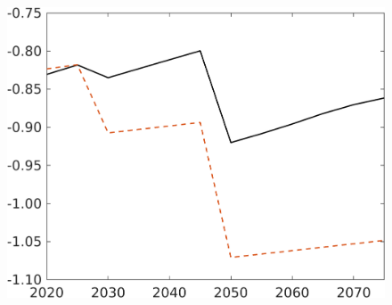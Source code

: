 \begin{figure}[h!!]
\begin{minipage}[]{0.32\textwidth}
\end{minipage}
\begin{minipage}[]{0.32\textwidth}
	\includegraphics[width=1\textwidth]{../../codding_model/own_basedOnFried/optimalPol_190722_tidiedUp/figures/all_July22/SWF_CompEffOPT_T_NoTaus_regime3_opteff_spillover0_noskill0_sep1_xgrowth0_countec0_etaa0.79_lgd0_lff0.png}
\end{minipage}
\end{figure}

